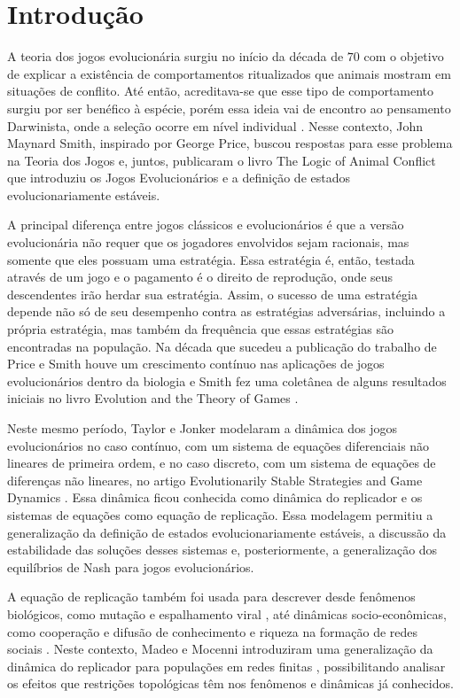 \chapter{Introdução}

A teoria dos jogos evolucionária surgiu no início da década de $70$ com o objetivo de explicar a existência de comportamentos ritualizados que animais mostram em situações de conflito. Até então, acreditava-se que esse tipo de comportamento surgiu por ser benéfico à espécie, porém essa ideia vai de encontro ao pensamento Darwinista, onde a seleção ocorre em nível individual \cite{maynardWoS}. Nesse contexto, John Maynard Smith, inspirado por George Price, buscou respostas para esse problema na Teoria dos Jogos e, juntos, publicaram o livro The Logic of Animal Conflict \cite{smith1973logic} que introduziu os Jogos Evolucionários e a definição de estados evolucionariamente estáveis.

A principal diferença entre jogos clássicos e evolucionários é que a versão evolucionária não requer que os jogadores envolvidos sejam racionais, mas somente que eles possuam uma estratégia. Essa estratégia é, então, testada através de um jogo e o pagamento é o direito de reprodução, onde seus descendentes irão herdar sua estratégia. Assim, o sucesso de uma estratégia depende não só de seu desempenho contra as estratégias adversárias, incluindo a própria estratégia, mas também da frequência que essas estratégias são encontradas na população. Na década que sucedeu a publicação do trabalho de Price e Smith houve um crescimento contínuo nas aplicações de jogos evolucionários dentro da biologia e Smith fez uma coletânea de alguns resultados iniciais no livro Evolution and the Theory of Games \cite{smith1982evolution}.

Neste mesmo período, Taylor e Jonker modelaram a dinâmica dos jogos evolucionários no caso contínuo, com um sistema de equações diferenciais não lineares de primeira ordem, e no caso discreto, com um sistema de equações de diferenças não lineares, no artigo Evolutionarily Stable Strategies and Game Dynamics \cite{taylor1978evolutionary}. Essa dinâmica ficou conhecida como dinâmica do replicador e os sistemas de equações como equação de replicação. Essa modelagem permitiu a generalização da definição de estados evolucionariamente estáveis, a discussão da estabilidade das soluções desses sistemas e, posteriormente, a generalização dos equilíbrios de Nash para jogos evolucionários.

A equação de replicação também foi usada para descrever desde fenômenos biológicos, como mutação e espalhamento viral \cite{nowak2006evolutionary}, até dinâmicas socio-econômicas, como cooperação \cite{nowak2006evolutionary} e difusão de conhecimento e riqueza na formação de redes sociais \cite{ehrhardt2006diffusion}. Neste contexto, Madeo e Mocenni introduziram uma generalização da dinâmica do replicador para populações em redes finitas \cite{madeo2015}, possibilitando analisar os efeitos que restrições topológicas têm nos fenômenos e dinâmicas já conhecidos.

